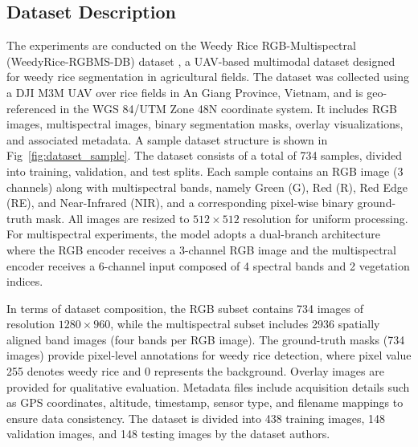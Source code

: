 \documentclass[pdflatex,sn-mathphys-num]{sn-jnl}
\begin{document}
\subsection{Dataset Description}
The experiments are conducted on the Weedy Rice RGB-Multispectral (WeedyRice-RGBMS-DB) dataset \cite{nguyen2025dataset}, a UAV-based multimodal dataset designed for weedy rice segmentation in agricultural fields. The dataset was collected using a DJI M3M UAV over rice fields in An Giang Province, Vietnam, and is geo-referenced in the WGS 84/UTM Zone 48N coordinate system. It includes RGB images, multispectral images, binary segmentation masks, overlay visualizations, and associated metadata. A sample dataset structure is shown in Fig~\ref{fig:dataset_sample}. The dataset consists of a total of 734 samples, divided into training, validation, and test splits. Each sample contains an RGB image (3 channels) along with multispectral bands, namely Green (G), Red (R), Red Edge (RE), and Near-Infrared (NIR), and a corresponding pixel-wise binary ground-truth mask. All images are resized to $512 \times 512$ resolution for uniform processing. For multispectral experiments, the model adopts a dual-branch architecture where the RGB encoder receives a 3-channel RGB image and the multispectral encoder receives a 6-channel input composed of 4 spectral bands and 2 vegetation indices.

In terms of dataset composition, the RGB subset contains 734 images of resolution $1280 \times 960$, while the multispectral subset includes 2936 spatially aligned band images (four bands per RGB image). The ground-truth masks (734 images) provide pixel-level annotations for weedy rice detection, where pixel value 255 denotes weedy rice and 0 represents the background. Overlay images are provided for qualitative evaluation. Metadata files include acquisition details such as GPS coordinates, altitude, timestamp, sensor type, and filename mappings to ensure data consistency. The dataset is divided into 438 training images, 148 validation images, and 148 testing images by the dataset authors. 
\end{document}
